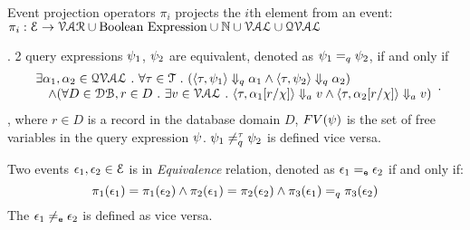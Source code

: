 % 
Event projection operators $\pi_i$ projects the $i$th element from an event: 
\\
$\pi_i : 
\mathcal{E} \to \mathcal{VAR}\cup \mbox{Boolean Expression}  \cup \mathbb{N} \cup \mathcal{VAL} \cup \mathcal{QVAL} $ 
\\
%
%
\begin{defn}.
%
\label{def:query_equal}
2 query expressions $\psi_1$, $\psi_2$ are equivalent, denoted as $\psi_1 =_{q} \psi_2$, if and only if
$$
 \begin{array}{l} 
  \exists \alpha_1, \alpha_2 \in \mathcal{QVAL} ~.~ \forall \mathtt{\tau} \in \mathcal{T} ~.~
    (\langle \mathtt{\tau},  \psi_1 \rangle \Downarrow_q \alpha_1 \land \langle \mathtt{\tau},  \psi_2  \rangle \Downarrow_q \alpha_2) 
    \\
    \quad \land (\forall D \in \mathcal{DB}, r \in D ~.~ 
    \exists v \in \mathcal{VAL} ~.~ 
          \langle \mathtt{\tau}, \alpha_1[r/\chi] \rangle \Downarrow_a v \land \langle \mathtt{\tau},  \alpha_2[r/\chi]  \rangle \Downarrow_a v)  
  \end{array}.
$$
%
, where $r \in D$ is a record in the database domain $D$, $FV(\psi)$ is the set of free variables in the query expression $\psi$.
$\psi_1 \neq_{q}^{\mathtt{\tau}} \psi_2$  is defined vice versa.
%
\end{defn}
%
\begin{defn}
Two events $\mathtt{\epsilon}_1, \mathtt{\epsilon}_2 \in \mathcal{E}$ is in \emph{Equivalence} relation, denoted as $\mathtt{\epsilon}_1 =_{\mathtt{e}} \mathtt{\epsilon}_2$ if and only if:
\[
\pi_1(\mathtt{\epsilon}_1) = \pi_1(\mathtt{\epsilon}_2) 
\land  
\pi_2(\mathtt{\epsilon}_1) = \pi_2(\mathtt{\epsilon}_2) 
\land
\pi_{3}(\mathtt{\epsilon}_1) =_q \pi_{3}(\mathtt{\epsilon}_2)
\]
%
The $\mathtt{\epsilon}_1 \neq_{\mathtt{e}} \mathtt{\epsilon}_2$ is defined as vice versa.
\end{defn}
